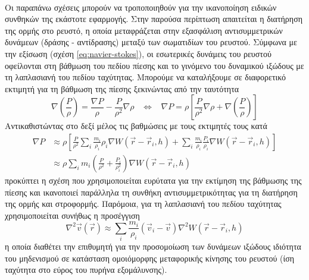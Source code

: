 \paragraph{} Οι παραπάνω σχέσεις μπορούν να τροποποιηθούν για την ικανοποίηση ειδικών
συνθηκών της εκάστοτε εφαρμογής. Στην παρούσα περίπτωση απαιτείται η διατήρηση της ορμής
στο ρευστό, η οποία μεταφράζεται στην εξασφάλιση αντισυμμετρικών δυνάμεων (δράσης -
αντίδρασης) μεταξύ των σωματιδίων του ρευστού. Σύμφωνα με την εξίσωση 
(σχέση \ref{eq:navier-stokes}), οι εσωτερικές δυνάμεις του ρευστού οφείλονται στη βάθμωση
του πεδίου πίεσης και το γινόμενο του δυναμικού ιξώδους με τη λαπλασιανή του πεδίου
ταχύτητας. Μπορούμε να καταλήξουμε σε διαφορετικό εκτιμητή για τη βάθμωση της πίεσης
ξεκινώντας από την ταυτότητα
\begin{equation*}
  \label{eq:grad-identity}
  \nabla \left( \frac{P}{\rho} \right) =
  \frac{\nabla P}{\rho}-
  \frac{P}{\rho^2} \nabla \rho
  \hspace{10pt} \Leftrightarrow \hspace{10pt}
  \nabla P = \rho \left[ \frac{P}{\rho^2} \nabla \rho + \nabla \left( \frac{P}{\rho}
    \right) \right]
\end{equation*}
Αντικαθιστώντας στο δεξί μέλος τις βαθμώσεις με τους εκτιμητές τους κατά 
\begin{align}
  \label{eq:grad-est}
  \nabla P &\approx \rho \left[ \frac{P}{\rho^2} \sum_i \frac{m_i}{\rho_i} \rho_i \nabla
             W(\vec{r}-\vec{r}_i, h)
             +
             \sum_i \frac{m_i}{\rho_i} \frac{P_i}{\rho_i} \nabla W(\vec{r}-\vec{r}_i, h)
             \right] \nonumber \\
           &\approx\rho \sum_i m_i \left(\frac{P}{\rho^2} + \frac{P_i}{\rho_i^2} \right)
             \nabla W(\vec{r}-\vec{r}_i, h)
\end{align}
προκύπτει η σχέση που χρησιμοποιείται ευρύτατα για την εκτίμηση της βάθμωσης της πίεσης
και ικανοποιεί παράλληλα τη συνθήκη αντισυμμετρικότητας για τη διατήρηση της ορμής και
στροφορμής. Παρόμοια, για τη λαπλασιανή του πεδίου ταχύτητας χρησιμοποιείται συνήθως η
προσέγγιση
\begin{equation}
  \label{eq:lapl-est}
  \nabla^2\vec{v}(\vec{r}) \approx \sum_i \frac{m_i}{\rho_i} (\vec{v}_i - \vec{v}) \nabla^2
  W(\vec{r}-\vec{r}_i, h)
\end{equation}
η οποία διαθέτει την επιθυμητή για την προσομοίωση των δυνάμεων ιξώδους ιδιότητα του
μηδενισμού σε κατάσταση ομοιόμορφης μεταφορικής κίνησης του ρευστού (ίση ταχύτητα στο
εύρος του πυρήνα εξομάλυνσης).

